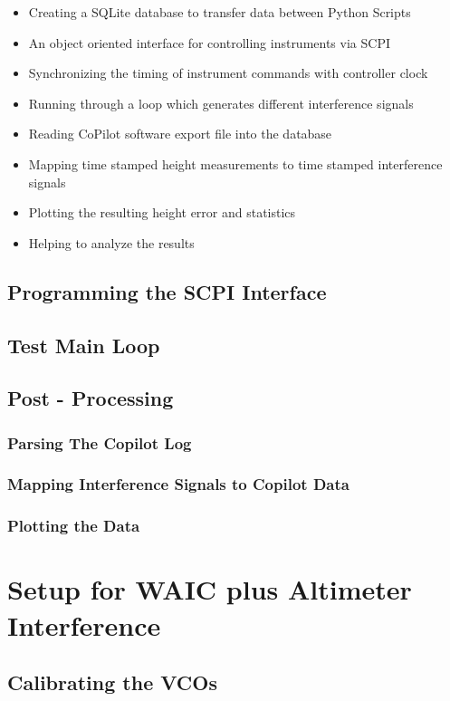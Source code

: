 \begin{itemize}
\item Creating a SQLite database to transfer data between Python Scripts
\item An object oriented interface for controlling instruments via SCPI
\item Synchronizing the timing of instrument commands with controller clock
\item Running through a loop which generates different interference signals
\item Reading CoPilot software export file into the database
\item Mapping time stamped height measurements to time stamped interference signals
\item Plotting the resulting height error and statistics 
\item Helping to analyze the results
\end{itemize}


\subsection{Programming the SCPI Interface}
\subsection{Test Main Loop}
\subsection{Post - Processing}
\subsubsection{Parsing The Copilot Log}
\subsubsection{Mapping Interference Signals to Copilot Data}
\subsubsection{Plotting the Data}

\section{Setup for WAIC plus Altimeter Interference}

\subsection{Calibrating the VCOs}

